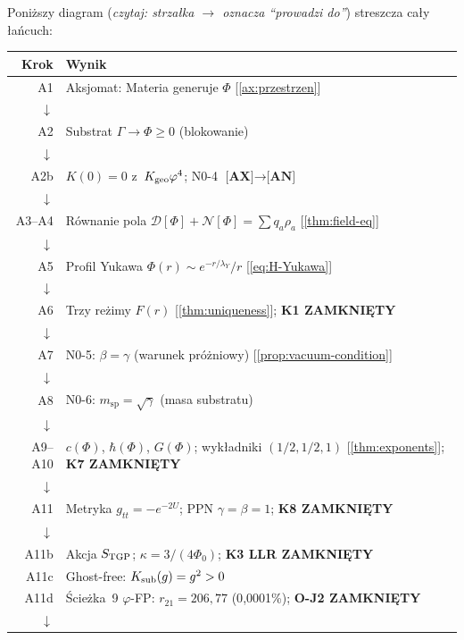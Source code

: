 Poni\.zszy diagram (\emph{czytaj: strza\l{}ka $\to$ oznacza
``prowadzi do''}) streszcza ca\l{}y \l{}a\'ncuch:

\begin{center}
\small
\begin{tabular}{@{}rl@{}}
\toprule
\textbf{Krok} & \textbf{Wynik} \\
\midrule
A1 & Aksjomat: Materia generuje $\Phi$ [\ref{ax:przestrzen}] \\
$\downarrow$ & \\
A2 & Substrat $\Gamma \to \Phi \geq 0$ (blokowanie) \\
$\downarrow$ & \\
A2b & $K(0)=0$ z~$K_{\rm geo}\varphi^4$; N0-4 $\textbf{[AX]}\to\textbf{[AN]}$ \\
$\downarrow$ & \\
A3--A4 & R\'ownanie pola $\mathcal{D}[\Phi] + \mathcal{N}[\Phi]
         = \sum q_a\rho_a$ [\ref{thm:field-eq}] \\
$\downarrow$ & \\
A5 & Profil Yukawa $\Phi(r) \sim e^{-r/\lambda_Y}/r$ [\ref{eq:H-Yukawa}] \\
$\downarrow$ & \\
A6 & Trzy re\.zimy $F(r)$ [\ref{thm:uniqueness}]; \textbf{K1 ZAMKNI\k{E}TY} \\
$\downarrow$ & \\
A7 & N0-5: $\beta = \gamma$ (warunek pr\'o\.zniowy) [\ref{prop:vacuum-condition}] \\
$\downarrow$ & \\
A8 & N0-6: $m_{\mathrm{sp}} = \sqrt{\gamma}$ (masa substratu) \\
$\downarrow$ & \\
A9--A10 & $c(\Phi)$, $\hbar(\Phi)$, $G(\Phi)$; wyk\l{}adniki $(1/2, 1/2, 1)$
         [\ref{thm:exponents}]; \textbf{K7 ZAMKNI\k{E}TY} \\
$\downarrow$ & \\
A11 & Metryka $g_{tt} = -e^{-2U}$; PPN $\gamma = \beta = 1$;
      \textbf{K8 ZAMKNI\k{E}TY} \\
$\downarrow$ & \\
A11b & Akcja $S_{\rm TGP}$; $\kappa = 3/(4\Phi_0)$;
       \textbf{K3 LLR ZAMKNI\k{E}TY} \\
A11c & Ghost-free: $K_{\rm sub}(g) = g^2 > 0$ \\
A11d & \'Scie\.zka~9 $\varphi$-FP: $r_{21} = 206{,}77$ (0{,}0001\%);
       \textbf{O-J2 ZAMKNI\k{E}TY} \\
$\downarrow$ & \\

\end{tabular}
\end{center}
